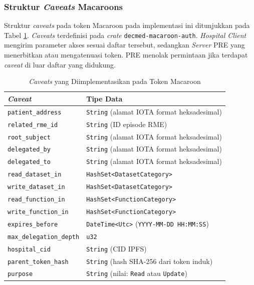 \subsubsection{Struktur \textit{Caveats} Macaroons}
\label{subsubsec:struktur-caveats-macaroons}

Struktur \textit{caveats} pada token Macaroon pada implementasi ini ditunjukkan pada Tabel \ref{tab:implementasi-caveats-macaroons}. \textit{Caveats} terdefinisi pada \textit{crate} \texttt{decmed-macaroon-auth}. \textit{Hospital Client} mengirim parameter akses sesuai daftar tersebut, sedangkan \textit{Server} PRE yang menerbitkan atau mengatenuasi token. PRE menolak permintaan jika terdapat \textit{caveat} di luar daftar yang didukung.

\begin{table}[H]
	\centering
	\caption{\textit{Caveats} yang Diimplementasikan pada Token Macaroon}
	\label{tab:implementasi-caveats-macaroons}
	\small
	\begin{tabular}{|p{}|p{}|}
		\hline
		\textbf{\textit{Caveat}}        & \textbf{Tipe Data}
		\\ \hline
		\texttt{patient\_address}       & \texttt{String} (alamat IOTA format heksadesimal)
		\\ \hline
		\texttt{related\_rme\_id}       & \texttt{String} (ID episode RME)
		\\ \hline
		\texttt{root\_subject}          & \texttt{String} (alamat IOTA format heksadesimal)
		\\ \hline
		\texttt{delegated\_by}          & \texttt{String} (alamat IOTA format heksadesimal)
		\\ \hline
		\texttt{delegated\_to}          & \texttt{String} (alamat IOTA format heksadesimal)
		\\ \hline
		\texttt{read\_dataset\_in}      & \texttt{HashSet<DatasetCategory>}
		\\ \hline
		\texttt{write\_dataset\_in}     & \texttt{HashSet<DatasetCategory>}
		\\ \hline
		\texttt{read\_function\_in}     & \texttt{HashSet<FunctionCategory>}
		\\ \hline
		\texttt{write\_function\_in}    & \texttt{HashSet<FunctionCategory>}
		\\ \hline
		\texttt{expires\_before}        & \texttt{DateTime<Utc>} (\texttt{YYYY-MM-DD HH:MM:SS})
		\\ \hline
		\texttt{max\_delegation\_depth} & \texttt{u32}
		\\ \hline
		\texttt{hospital\_cid}          & \texttt{String} (CID IPFS)
		\\ \hline
		\texttt{parent\_token\_hash}    & \texttt{String} (hash SHA-256 dari token induk)
		\\ \hline
		\texttt{purpose}                & \texttt{String} (nilai: \texttt{Read} atau \texttt{Update})
		\\ \hline
	\end{tabular}
\end{table}

